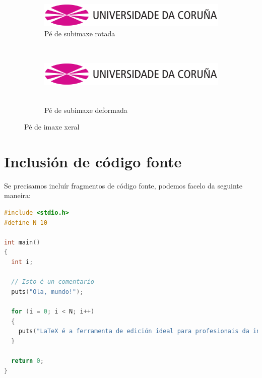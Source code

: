 \begin{figure}[hp!]
  \centering
  \begin{subfigure}[c]{0.3\textwidth}
    \includegraphics[angle=45,width=\textwidth]{imaxes/udc.png}
    \caption{Pé de subimaxe rotada}
    \label{fig:subfigura-rotada}
  \end{subfigure}
  \hspace{0.1\textwidth}
  \begin{subfigure}[c]{0.3\textwidth}
    \includegraphics[width=\textwidth,height=3cm]{imaxes/udc.png}
    \caption{Pé de subimaxe deformada}
    \label{fig:subfigura-deformada}
  \end{subfigure}
  \caption{Pé de imaxe xeral}
  \label{fig:exemplo-subfiguras}
\end{figure}

\section{Inclusión de código fonte}

Se precisamos incluír fragmentos de código fonte, podemos facelo da
seguinte maneira:

\begin{lstlisting}[language=C]
#include <stdio.h>
#define N 10

int main()
{
  int i;

  // Isto é un comentario
  puts("Ola, mundo!");

  for (i = 0; i < N; i++)
  {
    puts("LaTeX é a ferramenta de edición ideal para profesionais da informática!");
  }

  return 0;
}
\end{lstlisting}
